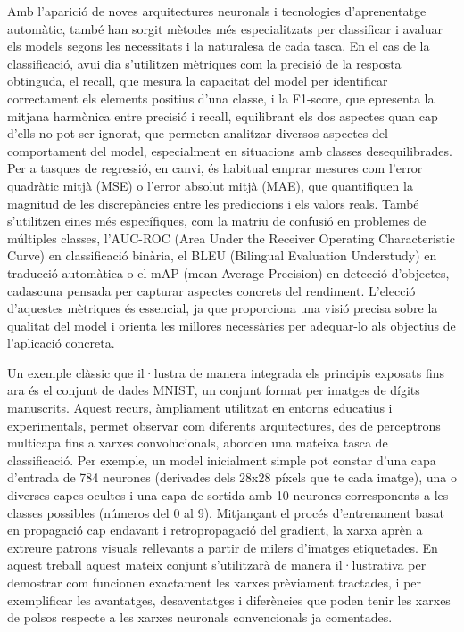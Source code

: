 \documentclass[a4paper,11pt, titlepage, twoside]{article}
\begin{document}
Amb l'aparició de noves arquitectures neuronals i tecnologies d'aprenentatge automàtic, també han sorgit mètodes més especialitzats per classificar i avaluar els models segons les necessitats i la naturalesa de cada tasca. En el cas de la classificació, avui dia s'utilitzen mètriques com la precisió de la resposta obtinguda, el recall, que mesura la capacitat del model per identificar correctament els elements positius d'una classe, i la F1-score, que epresenta la mitjana harmònica entre precisió i recall, equilibrant els dos aspectes quan cap d'ells no pot ser ignorat, que permeten analitzar diversos aspectes del comportament del model, especialment en situacions amb classes desequilibrades. Per a tasques de regressió, en canvi, és habitual emprar mesures com l'error quadràtic mitjà (MSE) o l'error absolut mitjà (MAE), que quantifiquen la magnitud de les discrepàncies entre les prediccions i els valors reals. També s'utilitzen eines més específiques, com la matriu de confusió en problemes de múltiples classes, l'AUC-ROC (Area Under the Receiver Operating Characteristic Curve) \cite{fawcett2006roc} en classificació binària, el BLEU (Bilingual Evaluation Understudy) \cite{papineni2002bleu} en traducció automàtica o el mAP (mean Average Precision) \cite{everingham2010pascal} en detecció d'objectes, cadascuna pensada per capturar aspectes concrets del rendiment. L'elecció d'aquestes mètriques és essencial, ja que proporciona una visió precisa sobre la qualitat del model i orienta les millores necessàries per adequar-lo als objectius de l'aplicació concreta.

Un exemple clàssic que il·lustra de manera integrada els principis exposats fins ara és el conjunt de dades MNIST, un conjunt format per imatges de dígits manuscrits. Aquest recurs, àmpliament utilitzat en entorns educatius i experimentals, permet observar com diferents arquitectures, des de perceptrons multicapa fins a xarxes convolucionals, aborden una mateixa tasca de classificació. Per exemple, un model inicialment simple pot constar d'una capa d'entrada de 784 neurones (derivades dels 28x28 píxels que te cada imatge), una o diverses capes ocultes i una capa de sortida amb 10 neurones corresponents a les classes possibles (números del 0 al 9). Mitjançant el procés d'entrenament basat en propagació cap endavant i retropropagació del gradient, la xarxa aprèn a extreure patrons visuals rellevants a partir de milers d'imatges etiquetades. En aquest treball aquest mateix conjunt s'utilitzarà de manera il·lustrativa per demostrar com funcionen exactament les xarxes prèviament tractades, i per exemplificar les avantatges, desaventatges i diferències que poden tenir les xarxes de polsos respecte a les xarxes neuronals convencionals ja comentades.
\end{document}
